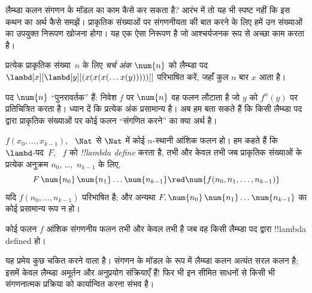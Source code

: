 \documentclass[../../../include/open-logic-section]{subfiles}
\begin{document}

लैम्ब्डा कलन संगणन के मॉडल का काम कैसे कर सकता है? आरंभ में तो यह भी स्पष्ट
नहीं कि इस कथन का अर्थ कैसे समझें। प्राकृतिक संख्याओं पर संगणनीयता की बात
करने के लिए हमें उन संख्याओं का उपयुक्त निरूपण खोजना होगा। यह एक ऐसा
निरूपण है जो आश्चर्यजनक रूप से अच्छा काम करता है।

\begin{defn}
प्रत्येक प्राकृतिक संख्या~$n$ के लिए \emph{चर्च अंक}
$\num{n}$ को लैम्ब्डा पद $\lambd[x][\lambd[y][(x(x(x(\dots x(y)))))]]$
परिभाषित करें, जहाँ कुल $n$ बार $x$ आता है।
\end{defn}

पद $\num{n}$ ``पुनरावर्तक'' हैं: निवेश $f$ पर $\num{n}$ वह फलन लौटाता है
जो $y$ को $f^n(y)$ पर प्रतिचित्रित करता है। ध्यान दें कि प्रत्येक अंक
प्रसामान्य है। अब हम बता सकते हैं कि किसी लैम्ब्डा पद द्वारा प्राकृतिक
संख्याओं पर कोई फलन ``संगणित करने'' का क्या अर्थ है।

\begin{defn}
$f(x_0, \dots, x_{k-1})$, ~$\Nat$ से $\Nat$ में कोई $n$-स्थानी आंशिक फलन
हो। हम कहते हैं कि $\lambd$-पद~$F$, ~$f$ को \emph{!!{lambda define}}
करता है, तभी और केवल तभी जब प्राकृतिक संख्याओं के प्रत्येक अनुक्रम $n_0$,
\dots,~$n_{k-1}$ के लिए,
\[
F\, \num{n_0}\, \num{n_1} \dots \num{n_{k-1}} \red \num{f(n_0, n_1, \dots,
  n_{k-1})}
\]
यदि $f(n_0, \dots, n_{k-1})$ परिभाषित है; और अन्यथा $F, \num{n_0}\,
\num{n_1} \dots \num{n_{k-1}}$ का कोई प्रसामान्य रूप न हो।
\end{defn}

\begin{thm}
कोई फलन $f$ आंशिक संगणनीय फलन तभी और केवल तभी है जब वह किसी लैम्ब्डा पद
द्वारा !!{lambda defined} हो।
\end{thm}

\begin{explain}
यह प्रमेय कुछ चकित करने वाला है। संगणन के मॉडल के रूप में लैम्ब्डा कलन
अत्यंत सरल कलन है; इसमें केवल लैम्ब्डा अमूर्तन और अनुप्रयोग संक्रियाएँ हैं!{}
फिर भी इन सीमित साधनों से किसी भी संगणनात्मक प्रक्रिया को कार्यान्वित करना
संभव है।
\end{explain}
\end{document}
